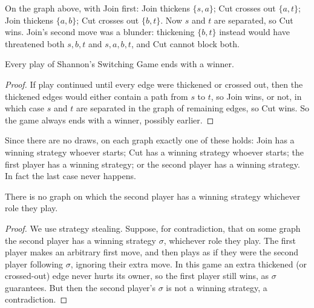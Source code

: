 \begin{center}
\end{center}

\begin{example}
On the graph above, with Join first: Join thickens $\{s,a\}$; Cut crosses out $\{a,t\}$; Join thickens $\{a,b\}$; Cut crosses out $\{b,t\}$. Now $s$ and $t$ are separated, so Cut wins. Join's second move was a blunder: thickening $\{b,t\}$ instead would have threatened both $s,b,t$ and $s,a,b,t$, and Cut cannot block both.
\end{example}

\begin{proposition}[No draws]
Every play of Shannon's Switching Game ends with a winner.
\end{proposition}
\begin{proof}
If play continued until every edge were thickened or crossed out, then the thickened edges would either contain a path from $s$ to $t$, so Join wins, or not, in which case $s$ and $t$ are separated in the graph of remaining edges, so Cut wins. So the game always ends with a winner, possibly earlier.
\end{proof}

\begin{note}
Since there are no draws, on each graph exactly one of these holds: Join has a winning strategy whoever starts; Cut has a winning strategy whoever starts; the first player has a winning strategy; or the second player has a winning strategy. In fact the last case never happens.
\end{note}

\bigskip
\begin{theorem}
There is no graph on which the second player has a winning strategy whichever role they play.
\end{theorem}
\begin{proof}
We use strategy stealing. Suppose, for contradiction, that on some graph the second player has a winning strategy $\sigma$, whichever role they play. The first player makes an arbitrary first move, and then plays as if they were the second player following $\sigma$, ignoring their extra move. In this game an extra thickened (or crossed-out) edge never hurts its owner, so the first player still wins, as $\sigma$ guarantees. But then the second player's $\sigma$ is not a winning strategy, a contradiction.
\end{proof}

